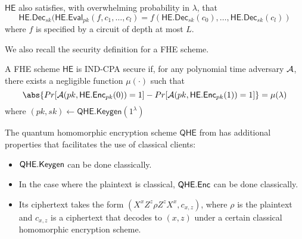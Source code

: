 $\mathsf{HE}$ also satisfies, with overwhelming probability in $\lambda$, that
$$\mathsf{HE.Dec}_{sk}(\mathsf{HE.Eval}_{pk}(f, c_1, \ldots, c_l)=f(\mathsf{HE.Dec}_{sk}(c_0),\ldots,\mathsf{HE.Dec}_{sk}(c_l))$$
where $f$ is specified by a circuit of depth at most $L$.


We also recall the security definition for a FHE scheme.

\begin{definition}
	A FHE scheme $\mathsf{HE}$ is IND-CPA secure if, for any polynomial time adversary $\mathcal{A}$, there exists a negligible function $\mu(\cdot)$ such that
	$$\abs{Pr[\cA(pk, \mathsf{HE.Enc}_{pk}(0))=1]-Pr[\cA(pk, \mathsf{HE.Enc}_{pk}(1))=1]}=\mu(\lambda)$$
	where $(pk, sk)\leftarrow\mathsf{QHE.Keygen}(1^\lambda)$
\end{definition}

The quantum homomorphic encryption scheme $\mathsf{QHE}$ from \cite{mahadev_qfhe} has additional properties that facilitates the use of classical clients:
\begin{itemize}
	\item $\mathsf{QHE.Keygen}$ can be done classically.
	\item In the case where the plaintext is classical, $\mathsf{QHE.Enc}$ can be done classically.
	\item Its ciphertext takes the form $(X^xZ^z\rho Z^zX^x, c_{x, z})$, where $\rho$ is the plaintext and $c_{x, z}$ is a ciphertext that decodes to $(x, z)$ under a certain classical homomorphic encryption scheme.
\end{itemize}
